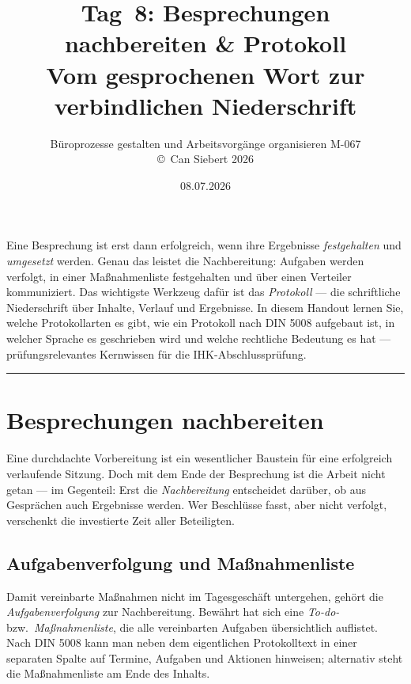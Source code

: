 \documentclass[11pt, a4paper]{article}
\title{\vspace*{-1.5cm}\Huge\bfseries\color{bfwPrimaryDark}Tag~8: Besprechungen nachbereiten \& Protokoll\\[0.4em]
  \large\color{bfwInkSoft}\textnormal{Vom gesprochenen Wort zur verbindlichen Niederschrift}}
\author{\textsf{Büroprozesse gestalten und Arbeitsvorgänge organisieren \textperiodcentered{} M-067}\\
\textsf{\small\copyright\ Can Siebert\,\textperiodcentered\,2026}}
\date{08.07.2026}
\begin{document}
\maketitle
\thispagestyle{empty}

\vspace{1em}
\begin{merksatz}[title={\bfseries Worum geht es heute?}]
Eine Besprechung ist erst dann erfolgreich, wenn ihre Ergebnisse \emph{festgehalten} und
\emph{umgesetzt} werden. Genau das leistet die Nachbereitung: Aufgaben werden verfolgt,
in einer Maßnahmenliste festgehalten und über einen Verteiler kommuniziert. Das wichtigste
Werkzeug dafür ist das \emph{Protokoll} --- die schriftliche Niederschrift über Inhalte,
Verlauf und Ergebnisse. In diesem Handout lernen Sie, welche Protokollarten es gibt, wie
ein Protokoll nach DIN 5008 aufgebaut ist, in welcher Sprache es geschrieben wird und
welche rechtliche Bedeutung es hat --- prüfungsrelevantes Kernwissen für die IHK-Abschlussprüfung.
\end{merksatz}

\tableofcontents
\vspace{1em}
\hrule
\vspace{1em}

\section{Besprechungen nachbereiten}

Eine durchdachte Vorbereitung ist ein wesentlicher Baustein für eine erfolgreich
verlaufende Sitzung. Doch mit dem Ende der Besprechung ist die Arbeit nicht getan ---
im Gegenteil: Erst die \emph{Nachbereitung} entscheidet darüber, ob aus Gesprächen auch
Ergebnisse werden. Wer Beschlüsse fasst, aber nicht verfolgt, verschenkt die investierte
Zeit aller Beteiligten.

\subsection{Aufgabenverfolgung und Maßnahmenliste}

Damit vereinbarte Maßnahmen nicht im Tagesgeschäft untergehen, gehört die
\emph{Aufgabenverfolgung} zur Nachbereitung. Bewährt hat sich eine \emph{To-do-} bzw.\
\emph{Maßnahmenliste}, die alle vereinbarten Aufgaben übersichtlich auflistet. Nach
DIN 5008 kann man neben dem eigentlichen Protokolltext in einer separaten Spalte auf
Termine, Aufgaben und Aktionen hinweisen; alternativ steht die Maßnahmenliste am Ende
des Inhalts.
\end{document}
